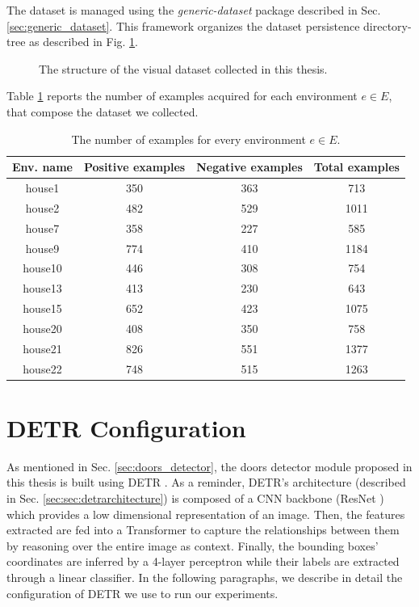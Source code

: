 The dataset is managed using the \textit{generic-dataset} package described in Sec. \ref{sec:generic_dataset}. This framework organizes the dataset persistence directory-tree as described in Fig. \ref{fig:organization_dataset}.

\begin{figure}[h!]
	\centering
	\begin{minipage}{7cm}
	\end{minipage}
	\caption{The structure of the visual dataset collected in this thesis.}
	\label{fig:organization_dataset}
\end{figure} 

Table \ref{tab:dataset_examples_number} reports the number of examples acquired for each environment $e \in E$, that compose the dataset we collected.

\begin{table}[h!]
	\centering
	\begin{tabular}{cccc}

	\toprule
	\textbf{Env. name} & \textbf{Positive examples} & \textbf{Negative examples} & \textbf{Total
		examples}\tabularnewline
	\midrule
	house1 & 350 & 363 & 713\tabularnewline
	house2 & 482 & 529 & 1011\tabularnewline
	house7 & 358 & 227 & 585\tabularnewline
	house9 & 774 & 410 & 1184\tabularnewline
	house10 & 446 & 308 & 754\tabularnewline
	house13 & 413 & 230 & 643\tabularnewline
	house15 & 652 & 423 & 1075\tabularnewline
	house20 & 408 & 350 & 758\tabularnewline
	house21 & 826 & 551 & 1377\tabularnewline
	house22 & 748 & 515 & 1263\tabularnewline
	\bottomrule
	\end{tabular}
	\caption{The number of examples for every environment $e \in E$.}
	\label{tab:dataset_examples_number}
\end{table}
\newpage
\section{DETR Configuration}

As mentioned in Sec. \ref{sec:doors_detector}, the doors detector module proposed in this thesis is built using DETR \cite{detr}. As a reminder, DETR's architecture (described in Sec. \ref{sec:sec:detrarchitecture}) is composed of a CNN backbone (ResNet \cite{resnet}) which  provides a low dimensional representation of an image. Then, the features extracted are fed into a Transformer \cite{transformer} to capture the relationships between them by reasoning over the entire image as context. Finally, the bounding boxes' coordinates are inferred by a 4-layer perceptron while their labels are extracted through a linear classifier. In the following paragraphs, we describe in detail the configuration of DETR we use to run our experiments.


